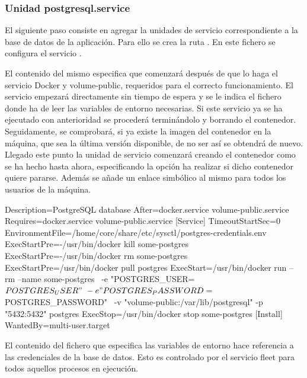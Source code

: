 \subsubsection{Unidad postgresql.service}

El siguiente paso consiste en agregar la unidades de servicio correspondiente a la base de datos de la aplicación. Para ello  se crea la ruta . En este fichero se configura el servicio .

El contenido del mismo especifica que comenzará después de que lo haga el servicio Docker y volume-public, requeridos para el correcto funcionamiento. El servicio empezará directamente sin tiempo de espera y se le indica el fichero donde ha de leer las variables de entorno necesarias. Si este servicio ya se ha ejecutado con anterioridad se procederá terminándolo y borrando el contenedor. Seguidamente, se comprobará, si ya existe la imagen del contenedor en la máquina, que sea la última versión disponible, de no ser así se obtendrá de nuevo. Llegado este punto la unidad de servicio comenzará creando el contenedor como se ha hecho hasta ahora, especificando la opción ha realizar si dicho contenedor quiere pararse. Además se añade un enlace simbólico al mismo para todos los usuarios de la máquina. 

\begin{codelisting}
\label{code:postgresql.service}
\begin{code}
[Unit] 
  Description=PostgreSQL database 
  After=docker.service volume-public.service
  Requires=docker.service volume-public.service
[Service] 
  TimeoutStartSec=0
  EnvironmentFile=/home/core/share/etc/sysctl/postgres-credentials.env
  ExecStartPre=-/usr/bin/docker kill some-postgres 
  ExecStartPre=-/usr/bin/docker rm some-postgres 
  ExecStartPre=/usr/bin/docker pull postgres 
  ExecStart=/usr/bin/docker run --rm --name some-postgres \
  -e "POSTGRES_USER=${POSTGRES_USER}" \
  -e "POSTGRES_PASSWORD=${POSTGRES_PASSWORD}" \
  -v "volume-public:/var/lib/postgresql" -p "5432:5432" postgres 
  ExecStop=/usr/bin/docker stop some-postgres 
[Install] 
  WantedBy=multi-user.target
\end{code}
\end{codelisting}

El contenido del fichero que especifica las variables de entorno hace referencia a las credenciales de la base de datos. Esto es controlado por el servicio fleet para todos aquellos procesos en ejecución.

